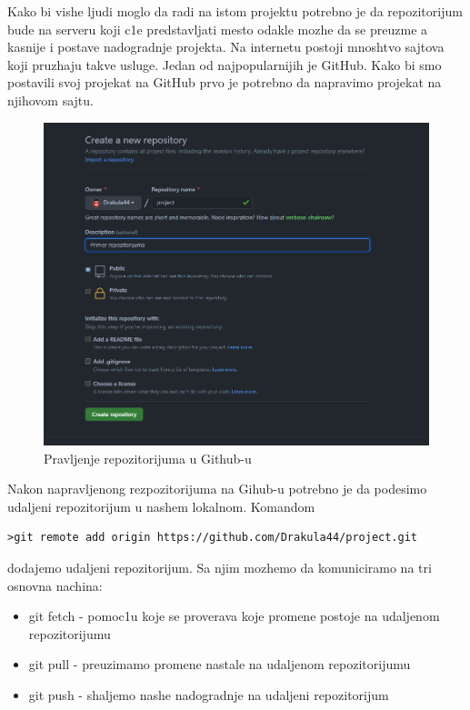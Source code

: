 \documentclass[a4paper,fleqn,12pt]{JMThesis}
\newcommand{\latin}{\fontencoding{T1}\selectfont}
\theoremstyle{plain}
\theoremstyle{definition}
\begin{document}
Kako bi vishe ljudi moglo da radi na istom projektu potrebno je da repozitorijum bude na serveru koji c1e predstavljati mesto odakle mozhe da se preuzme a kasnije i postave nadogradnje projekta. 
Na internetu postoji mnoshtvo sajtova koji pruzhaju takve usluge. Jedan od najpopularnijih je {\latin GitHub}.
Kako bi smo postavili svoj projekat na {\latin GitHub} prvo je potrebno da napravimo projekat na njihovom sajtu.

\begin{figure}[H]
    \centering
    \includegraphics[scale=0.4]{pravljenje repa.png}
    \caption{Pravljenje repozitorijuma u {\latin Github}-u}
    \label{fig:pravljenje-rep}
\end{figure}

Nakon napravljenong rezpozitorijuma na {\latin Gihub-u} potrebno je da podesimo udaljeni repozitorijum u nashem lokalnom. Komandom

{\latin
\begin{center}
\begin{lstlisting}[caption={\latin git remote add}]
>git remote add origin https://github.com/Drakula44/project.git
\end{lstlisting}
\end{center}
}

dodajemo udaljeni repozitorijum. Sa njim mozhemo da komuniciramo na tri osnovna nachina:
\begin{itemize}
    \item {\latin git fetch} - pomoc1u koje se proverava koje promene postoje na udaljenom repozitorijumu
    \item {\latin git pull} - preuzimamo promene nastale na udaljenom repozitorijumu
    \item {\latin git push} - shaljemo nashe nadogradnje na udaljeni repozitorijum
\end{itemize}
\end{document}
